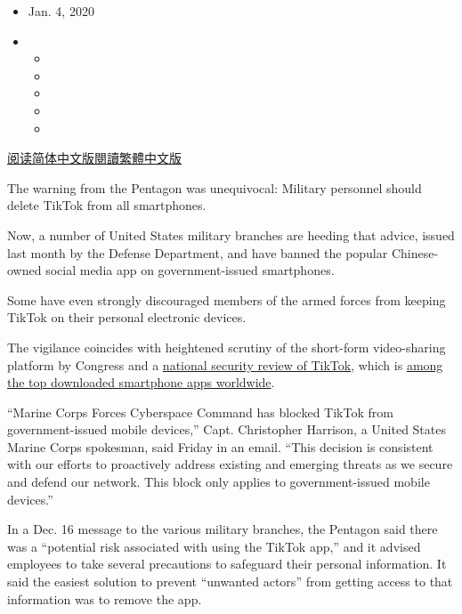 \begin{itemize}
\item
  Jan. 4, 2020
\item
  \begin{itemize}
  \item
  \item
  \item
  \item
  \item
  \end{itemize}
\end{itemize}

\href{https://cn.nytimes.com/usa/20200106/tiktok-pentagon-military-ban/}{阅读简体中文版}\href{https://cn.nytimes.com/usa/20200106/tiktok-pentagon-military-ban/zh-hant/}{閱讀繁體中文版}

The warning from the Pentagon was unequivocal: Military personnel should
delete TikTok from all smartphones.

Now, a number of United States military branches are heeding that
advice, issued last month by the Defense Department, and have banned the
popular Chinese-owned social media app on government-issued smartphones.

Some have even strongly discouraged members of the armed forces from
keeping TikTok on their personal electronic devices.

The vigilance coincides with heightened scrutiny of the short-form
video-sharing platform by Congress and a
\href{https://www.nytimes.com/2019/11/01/technology/tiktok-national-security-review.html}{national
security review of TikTok}, which is
\href{https://sensortower.com/blog/q3-2019-data-digest}{among the top
downloaded smartphone apps worldwide}.

``Marine Corps Forces Cyberspace Command has blocked TikTok from
government-issued mobile devices,'' Capt. Christopher Harrison, a United
States Marine Corps spokesman, said Friday in an email. ``This decision
is consistent with our efforts to proactively address existing and
emerging threats as we secure and defend our network. This block only
applies to government-issued mobile devices.''

In a Dec. 16 message to the various military branches, the Pentagon said
there was a ``potential risk associated with using the TikTok app,'' and
it advised employees to take several precautions to safeguard their
personal information. It said the easiest solution to prevent ``unwanted
actors'' from getting access to that information was to remove the app.

